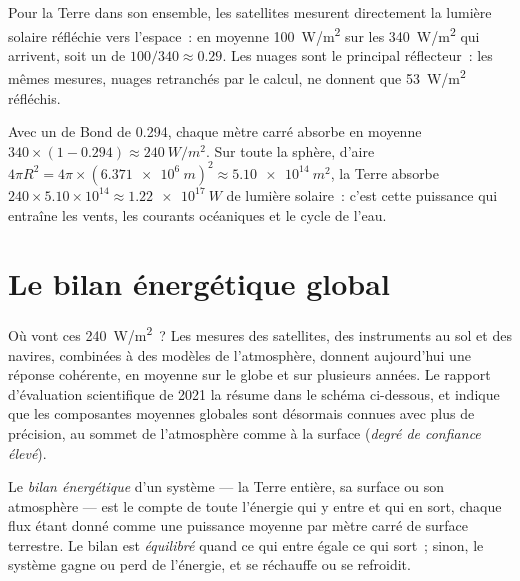 Pour la Terre dans son ensemble, les satellites mesurent directement la
lumière solaire réfléchie vers l'espace~: en moyenne \qty{100}{W/m^2} sur
les \qty{340}{W/m^2} qui arrivent, soit un  de $100/340 \approx 0.29$.
Les nuages sont le principal réflecteur~: les mêmes mesures, nuages
retranchés par le calcul, ne donnent que \qty{53}{W/m^2} réfléchis.

\begin{example}\label{ex:g10:earth-energy-budget:absorbed}
Avec un  de Bond de 0.294, chaque mètre carré absorbe en moyenne
$340
\times (1 - 0.294) \approx \qty{240}{W/m^2}$. Sur toute la sphère,
d'aire $4\pi R^2 = 4\pi \times (\qty{6.371e6}{m})^2 \approx \qty{5.10e14}{m^2}$,
la Terre absorbe $240 \times 5.10\times10^{14} \approx \qty{1.22e17}{W}$ de
lumière solaire~: c'est cette puissance qui entraîne les vents, les courants
océaniques et le cycle de l'eau.
\end{example}

\section{Le bilan énergétique global}

Où vont ces \qty{240}{W/m^2}~? Les mesures des satellites, des instruments
au sol et des navires, combinées à des modèles de l'atmosphère, donnent
aujourd'hui une réponse cohérente, en moyenne sur le globe et sur plusieurs
années. Le rapport d'évaluation scientifique de 2021 la résume dans le
schéma ci-dessous, et indique que les composantes moyennes globales sont
désormais connues avec plus de précision, au sommet de l'atmosphère comme à
la surface (\emph{degré de confiance élevé}).

\begin{definition}\label{def:g10:earth-energy-budget:energy-budget}
Le \emph{bilan énergétique} d'un
système --- la Terre entière, sa surface ou son atmosphère --- est le compte
de toute l'énergie qui y entre et qui en sort, chaque flux étant donné comme
une puissance moyenne par mètre carré de surface terrestre. Le bilan est
\emph{équilibré} quand ce qui entre égale ce qui sort~; sinon, le système
gagne ou perd de l'énergie, et se réchauffe ou se refroidit.
\end{definition}

